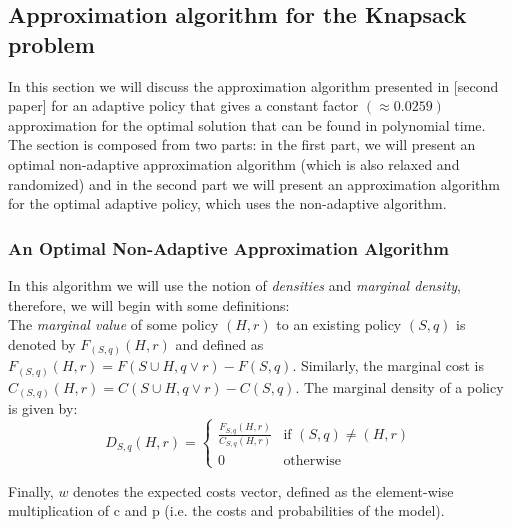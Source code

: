 \subsection{Approximation algorithm for the Knapsack problem}\label{sec:knapsack}
In this section we will discuss the approximation algorithm presented in [second paper] for an adaptive policy that gives a constant factor $ (\approx 0.0259)$ approximation for the optimal solution that can be found in polynomial time. The section is composed from two parts: in the first part, we will present an optimal non-adaptive approximation algorithm (which is also relaxed and randomized) and in the second part we will present an approximation algorithm for the optimal adaptive policy, which uses the non-adaptive algorithm.
\subsubsection{An Optimal Non-Adaptive Approximation Algorithm}
In this algorithm we will use the notion of \textit{densities} and \textit{marginal density}, therefore, we will begin with some definitions:
\\The \textit{marginal value} of some policy $(H, r)$ to an existing policy $(S, q)$ is denoted by $F_{(S,q)}(H, r)$ and defined as $F_{(S,q)}(H, r) = F(S \cup H, q \vee r) − F(S, q)$. Similarly, the marginal cost is $C_{(S,q)}(H, r) = C(S \cup H, q \vee r) − C(S, q)$. The marginal density of a policy is given by: 
\[
    D_{S,q}(H, r) = 
\begin{cases}
    \frac{F_{S,q}(H, r)}{C_{S,q}(H, r)}& \text{if } (S, q) \neq (H, r)\\
    0              & \text{otherwise}
\end{cases}
\]

Finally, $w$ denotes the expected costs vector, defined as the element-wise multiplication of c and p (i.e. the costs and probabilities of the model).

